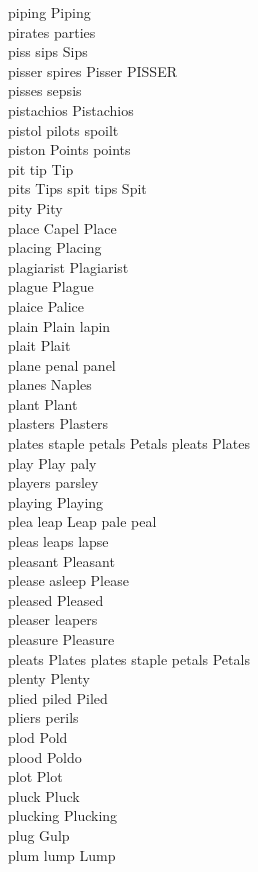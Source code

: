 piping Piping\\
pirates parties\\
piss sips Sips\\
pisser spires Pisser PISSER\\
pisses sepsis\\
pistachios Pistachios\\
pistol pilots spoilt\\
piston Points points\\
pit tip Tip\\
pits Tips spit tips Spit\\
pity Pity\\
place Capel Place\\
placing Placing\\
plagiarist Plagiarist\\
plague Plague\\
plaice Palice\\
plain Plain lapin\\
plait Plait\\
plane penal panel\\
planes Naples\\
plant Plant\\
plasters Plasters\\
plates staple petals Petals pleats Plates\\
play Play paly\\
players parsley\\
playing Playing\\
plea leap Leap pale peal\\
pleas leaps lapse\\
pleasant Pleasant\\
please asleep Please\\
pleased Pleased\\
pleaser leapers\\
pleasure Pleasure\\
pleats Plates plates staple petals Petals\\
plenty Plenty\\
plied piled Piled\\
pliers perils\\
plod Pold\\
plood Poldo\\
plot Plot\\
pluck Pluck\\
plucking Plucking\\
plug Gulp\\
plum lump Lump\\
